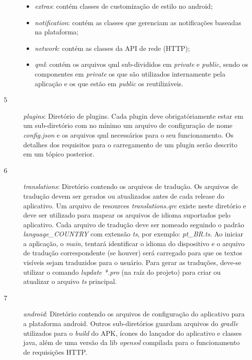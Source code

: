 \begin{description}
\begin{itemize}
		\item \textit{extras}: contém classes de customização de estilo no android;

		\item \textit{notification}: contém as classes que gerenciam as notificações baseadas na plataforma;

		\item \textit{network}: contém as classes da API de rede (HTTP);

		\item \textit{qml}: contém os arquivos qml sub-divididos em \textit{private} e \textit{public}, sendo os componentes em \textit{private} os que são utilizados internamente pela aplicação e os que estão em \textit{public} os reutilizáveis.
	\end{itemize}

	\item[5] \textit{plugins}: Diretório de plugins. Cada plugin deve obrigatóriamente estar em um sub-diretório com no mínimo um arquivo de configuração de nome \textit{config.json} e os arquivos qml necessários para o seu funcionamento. Os detalhes dos requisitos para o carregamento de um plugin serão descrito em um tópico posterior.

	\item[6] \textit{translations}: Diretório contendo os arquivos de tradução. Os arquivos de tradução devem ser gerados ou atualizados antes de cada release do aplicativo. Um arquivo de resources \textit{translations.qrc} existe neste diretório e deve ser utilizado para mapear os arquivos de idioma suportados pelo aplicativo. Cada arquivo de tradução deve ser nomeado seguindo o padrão \textit{language\_COUNTRY} com extensão \textit{ts}, por exemplo: \textit{pt\_BR.ts}. Ao iniciar a aplicação, o \textit{main}, tentará identificar o idioma do dispositivo e o arquivo de tradução correspondente (se houver) será carregado para que os textos visíveis sejam traduzidos para o usuário. Para gerar as traduções, deve-se utilizar o comando \textit{lupdate *.pro} (na raíz do projeto) para criar ou atualizar o arquivo \textit{ts} principal.

	\item[7] \textit{android}: Diretório contendo os arquivos de configuração do aplicativo para a plataforma android. Outros sub-diretórios guardam arquivos do \textit{gradle} utilizados para o \textit{build} do APK, ícones do lançador do aplicativo e classes java, além de uma versão da lib \textit{openssl} compilada para o funcionamento de requisições HTTP.


\end{description}
